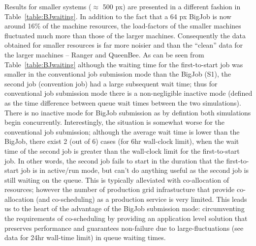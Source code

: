 \documentclass[conference,final]{IEEEtran}
\begin{document}
Results for smaller systems ($\approx$ 500 px) are presented
in a different fashion in Table~\ref{table:BJwaiting}. In addition to
the fact that a 64 px BigJob is now around 16\% of the machine
resources, the load-factors of the smaller machines fluctuated much
more than those of the larger machines. Consequently the data obtained
for smaller resources is far more noisier and than the ``clean'' data
for the larger machines -- Ranger and QueenBee. As can be seen from
Table~\ref{table:BJwaiting} although the waiting time for the
first-to-start job was smaller in the conventional job submission mode
than the BigJob (S1), the second job (convention job) had a large
subsequent wait time; thus for conventional job submission mode there
is a non-negligible inactive mode (defined as the time difference
between queue wait times between the two simulations). There is no
inactive mode for BigJob submission as by defintion both simulations
begin concurrently. Interestingly, the situation is somewhat worse for
the conventional job submission; although the average wait time is
lower than the BigJob, there exist 2 (out of 6) cases (for 6hr
wall-clock limit), when the wait time of the second job is greater
than the wall-clock limit for the first-to-start job. In other words,
the second job fails to start in the duration that the first-to-start
job is in active/run mode, but can't do anything useful as the second
job is still waiting on the queue. This is typically alleviated with
co-allocation of resources; however the number of production grid
infrastucture that provide co-allocation (and co-scheduling) as a
production service is very limited. This leads us to the heart of the
advantage of the BigJob submission mode: circumventing the
requirements of co-scheduling by providing an application level
solution that preserves performance and guarantees non-failure due to
large-fluctuations (see data for 24hr wall-time limit) in queue
waiting times.



\end{document}

